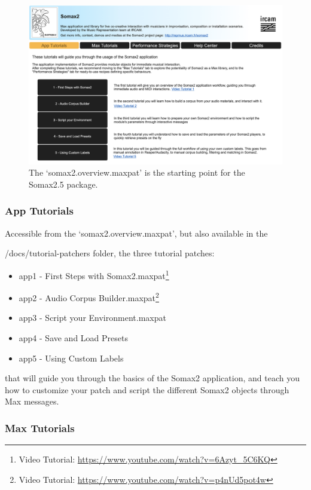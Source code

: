  \begin{figure}[h!]
    \centering        
 	\includegraphics[width=1\textwidth, keepaspectratio]{img/somax2_overview.png}
    \caption{The `somax2.overview.maxpat' is the starting point for the Somax2.5 package.}
    \label{fig:overview}
\end{figure}

\subsubsection{App Tutorials}

Accessible from the `somax2.overview.maxpat', but also available in the 

/docs/tutorial-patchers folder, the three tutorial patches:
\begin{itemize}
    \item app1 - First Steps with Somax2.maxpat\footnote{Video Tutorial: \url{https://www.youtube.com/watch?v=6Azyt_5C6KQ}}
    \item app2 - Audio Corpus Builder.maxpat\footnote{Video Tutorial: \url{https://www.youtube.com/watch?v=p4nUd5pot4w}}
    \item app3 - Script your Environment.maxpat
    \item app4 - Save and Load Presets
    \item app5 - Using Custom Labels
\end{itemize}

that will guide you through the basics of the Somax2 application, and teach you how to customize your patch and script the different Somax2 objects through Max messages.

\subsubsection{Max Tutorials}

